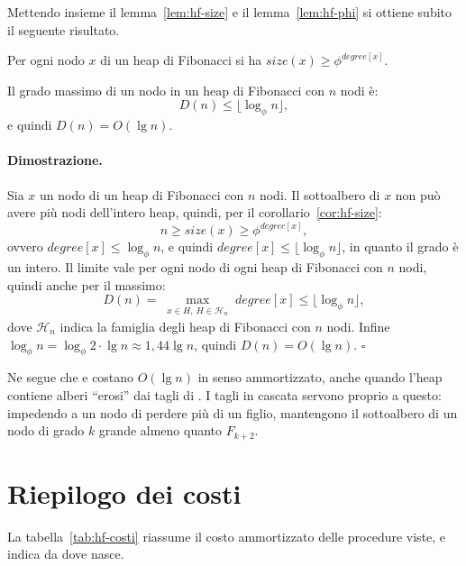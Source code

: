 Mettendo insieme il lemma~\ref{lem:hf-size} e il lemma~\ref{lem:hf-phi} si ottiene subito il seguente risultato.

\begin{corollario}\label{cor:hf-size}
Per ogni nodo $x$ di un heap di Fibonacci si ha $\mathit{size}(x) \ge \phi^{\mathit{degree}[x]}$.
\end{corollario}

\begin{corollario}\label{cor:hf-grado}
Il grado massimo di un nodo in un heap di Fibonacci con $n$ nodi è:
\[
D(n) \le \lfloor \log_\phi n \rfloor,
\]
e quindi $D(n) = O(\lg n)$.
\end{corollario}

\paragraph{Dimostrazione.}
Sia $x$ un nodo di un heap di Fibonacci con $n$ nodi. Il sottoalbero di $x$ non può avere più nodi dell'intero heap, quindi, per il corollario~\ref{cor:hf-size}:
\[
n \ge \mathit{size}(x) \ge \phi^{\mathit{degree}[x]},
\]
ovvero $\mathit{degree}[x] \le \log_\phi n$, e quindi $\mathit{degree}[x] \le \lfloor \log_\phi n \rfloor$, in quanto il grado è un intero. Il limite vale per ogni nodo di ogni heap di Fibonacci con $n$ nodi, quindi anche per il massimo:
\[
D(n) = \max_{\substack{x \in H,\ H \in \mathcal{H}_n}} \mathit{degree}[x] \le \lfloor \log_\phi n \rfloor,
\]
dove $\mathcal{H}_n$ indica la famiglia degli heap di Fibonacci con $n$ nodi. Infine $\log_\phi n = \log_\phi 2 \cdot \lg n \approx 1{,}44 \lg n$, quindi $D(n) = O(\lg n)$. \hfill $\square$

Ne segue che \FibHeapExtractMin{} e \FibHeapDelete{} costano $O(\lg n)$ in senso ammortizzato, anche quando l'heap contiene alberi ``erosi'' dai tagli di \FibHeapDecreaseKey{}. I tagli in cascata servono proprio a questo: impedendo a un nodo di perdere più di un figlio, mantengono il sottoalbero di un nodo di grado $k$ grande almeno quanto $F_{k+2}$.

\section{Riepilogo dei costi}\label{sec:hf-costi}
La tabella~\ref{tab:hf-costi} riassume il costo ammortizzato delle procedure viste, e indica da dove nasce.

